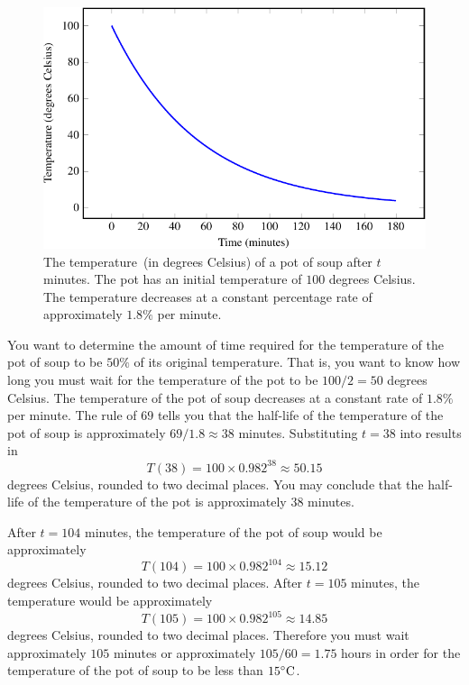 \documentclass[a4paper,oneside,12pt]{article}
\begin{document}
{\begin{solution}
\begin{figure}[!htbp]
\centering
\includegraphics[scale=1.1]{image/11/soup.pdf}
\caption{%
  The temperature~(in degrees Celsius) of a pot of soup after $t$
  minutes.  The pot has an initial temperature of $100$ degrees
  Celsius.  The temperature decreases at a constant percentage rate of
  approximately $1.8\%$ per minute.
}
\label{fig:exponential:soup_temperature}
\end{figure}

You want to determine the amount of time required for the temperature
of the pot of soup to be $50\%$ of its original temperature.  That is,
you want to know how long you must wait for the temperature of the pot
to be $100 / 2 = 50$ degrees Celsius.  The temperature of the pot of
soup decreases at a constant rate of $1.8\%$ per minute.  The rule of
$69$ tells you that the half-life of the temperature of the pot of
soup is approximately $69 / 1.8 \approx 38$ minutes.  Substituting
$t = 38$ into  results in
\[
T(38)
=
100 \times 0.982^{38}
\approx
50.15
\]
degrees Celsius, rounded to two decimal places.  You may conclude
that the half-life of the temperature of the pot is approximately $38$
minutes.

After $t = 104$ minutes, the temperature of the pot of soup would be
approximately
\[
T(104)
=
100 \times 0.982^{104}
\approx
15.12
\]
degrees Celsius, rounded to two decimal places.  After $t = 105$
minutes, the temperature would be approximately
\[
T(105)
=
100 \times 0.982^{105}
\approx
14.85
\]
degrees Celsius, rounded to two decimal places.  Therefore you must
wait approximately $105$ minutes or approximately
$105 / 60 = 1.75$ hours in order for the temperature of the pot of
soup to be less than ${15}^{\circ}\textrm{C}$.
\end{solution}
}{}
\end{document}

